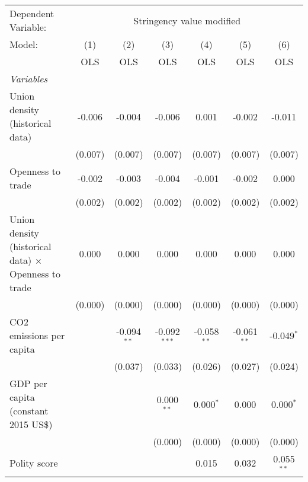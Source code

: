 
\begingroup
\centering
\begin{tabular}{lcccccc}
   \toprule
   Dependent Variable: & \multicolumn{6}{c}{Stringency value modified}\\
   Model:                                                      & (1)     & (2)           & (3)            & (4)           & (5)           & (6)\\  
                                                               &  OLS    & OLS           & OLS            & OLS           & OLS           & OLS\\  
   \midrule
   \emph{Variables}\\
   Union density (historical data)                             & -0.006  & -0.004        & -0.006         & 0.001         & -0.002        & -0.011\\   
                                                               & (0.007) & (0.007)       & (0.007)        & (0.007)       & (0.007)       & (0.007)\\   
   Openness to trade                                           & -0.002  & -0.003        & -0.004         & -0.001        & -0.002        & 0.000\\   
                                                               & (0.002) & (0.002)       & (0.002)        & (0.002)       & (0.002)       & (0.002)\\   
   Union density (historical data) $\times$ Openness to trade  & 0.000   & 0.000         & 0.000          & 0.000         & 0.000         & 0.000\\   
                                                               & (0.000) & (0.000)       & (0.000)        & (0.000)       & (0.000)       & (0.000)\\   
   CO2 emissions per capita                                    &         & -0.094$^{**}$ & -0.092$^{***}$ & -0.058$^{**}$ & -0.061$^{**}$ & -0.049$^{*}$\\   
                                                               &         & (0.037)       & (0.033)        & (0.026)       & (0.027)       & (0.024)\\   
   GDP per capita (constant 2015 US\$)                         &         &               & 0.000$^{**}$   & 0.000$^{*}$   & 0.000         & 0.000$^{*}$\\   
                                                               &         &               & (0.000)        & (0.000)       & (0.000)       & (0.000)\\   
   Polity score                                                &         &               &                & 0.015         & 0.032         & 0.055$^{**}$\\   

\end{tabular}
